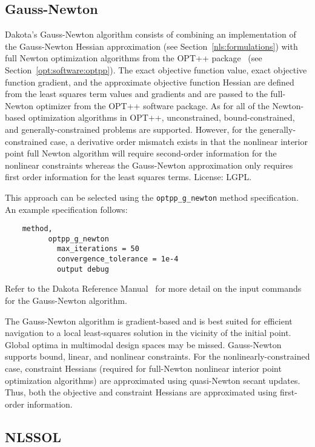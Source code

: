 \subsection{Gauss-Newton}\label{nls:solution:gauss}

Dakota's Gauss-Newton algorithm consists of combining an
implementation of the Gauss-Newton Hessian approximation (see
Section~\ref{nls:formulations}) with full Newton optimization
algorithms from the OPT++ package~\cite{MeOlHoWi07} (see
Section~\ref{opt:software:optpp}).  The exact objective function
value, exact objective function gradient, and the approximate
objective function Hessian are defined from the least squares term
values and gradients and are passed to the full-Newton optimizer from
the OPT++ software package. As for all of the Newton-based
optimization algorithms in OPT++, unconstrained, bound-constrained,
and generally-constrained problems are supported. However, for the
generally-constrained case, a derivative order mismatch exists in that
the nonlinear interior point full Newton algorithm will require
second-order information for the nonlinear constraints whereas the
Gauss-Newton approximation only requires first order information for
the least squares terms.  License: LGPL.

This approach can be selected using
the \texttt{optpp\_g\_newton} method specification. An example
specification follows:
\begin{small}
\begin{verbatim}
    method,
          optpp_g_newton
            max_iterations = 50
            convergence_tolerance = 1e-4
            output debug
\end{verbatim}
\end{small}

Refer to the Dakota Reference Manual~\cite{RefMan} for more detail on the
input commands for the Gauss-Newton algorithm.

The Gauss-Newton algorithm is gradient-based and is best suited for
efficient navigation to a local least-squares solution in the vicinity
of the initial point. Global optima in multimodal design spaces may be
missed. Gauss-Newton supports bound, linear, and nonlinear
constraints. For the nonlinearly-constrained case, constraint Hessians
(required for full-Newton nonlinear interior point optimization
algorithms) are approximated using quasi-Newton secant updates.  Thus,
both the objective and constraint Hessians are approximated using
first-order information.

\subsection{NLSSOL}\label{nls:solution:nlssol}

